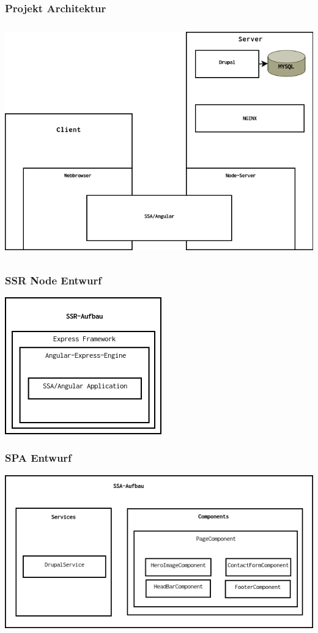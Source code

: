 \documentclass[11pt,a4paper]{article}
\begin{document}
\begin{appendices}
\subsubsection{Projekt Architektur}
\label{sec:eprojekt}
\includegraphics[scale=0.5,height=10cm]{Entwurf}
\subsubsection{SSR Node Entwurf}
\includegraphics[scale=1]{SSR}
\label{sec:essr}
\subsubsection{SPA Entwurf}
\label{sec:espa}
\includegraphics[scale=0.7]{SSA}

\end{appendices}
\end{document}
